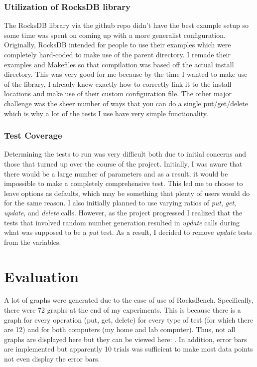 \documentclass[twocolumn,11pt]{article}
\begin{document}
\subsubsection{Utilization of RocksDB library}

The RocksDB library via the github repo didn't have the best example setup so
some time was spent on coming up with a more generalist configuration.
Originally, RocksDB intended for people to use their examples which were
completely hard-coded to make use of the parent directory. I remade their
examples and Makefiles so that compilation was based off the actual install
directory. This was very good for me because by the time I wanted to make use of
the library, I already knew exactly how to correctly link it to the install
locations and make use of their custom configuration file. The other major
challenge was the sheer number of ways that you can do a single put/get/delete
which is why a lot of the tests I use have very simple functionality.

\subsubsection{Test Coverage}

Determining the tests to run was very difficult both due to initial concerns and
those that turned up over the course of the project. Initially, I was aware that
there would be a large number of parameters and as a result, it would be
impossible to make a completely comprehensive test. This led me to choose to
leave options as defaults, which may be something that plenty of users would do
for the same reason. I also initially planned to use varying ratios of
\textit{put}, \textit{get}, \textit{update}, and \textit{delete} calls. However,
as the project progressed I realized that the tests that involved random number
generation resulted in \textit{update} calls during what was supposed to be a
\textit{put} test. As a result, I decided to remove \textit{update} tests from
the variables.

\section{Evaluation}

A lot of graphs were generated due to the ease of use of RocksBench.
Specifically, there were 72 graphs at the end of my experiments. This is because
there is a graph for every operation (put, get, delete) for every type of test
(for which there are 12) and for both computers (my home and lab computer).
Thus, not all graphs are displayed here but they can be viewed here: \href{}{}.
In addition, error bars are implemented but apparently 10 trials was sufficient
to make most data points not even display the error bars.
\end{document}
